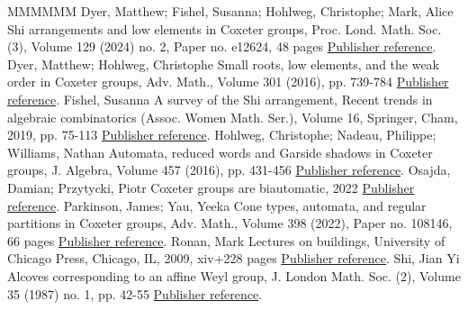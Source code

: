 \begin{thebibliography}{MMMMMM}
 Dyer, Matthew; Fishel, Susanna; Hohlweg, Christophe; Mark, Alice Shi arrangements and low elements in Coxeter groups, Proc. Lond. Math. Soc. (3), Volume 129 (2024) no. 2, Paper no. e12624, 48 pages \href{https://alco.centre-mersenne.org/articles/10.5802/alco.387/#DHFM}{Publisher reference}.
 Dyer, Matthew; Hohlweg, Christophe Small roots, low elements, and the weak order in Coxeter groups, Adv. Math., Volume 301 (2016), pp. 739-784 \href{https://alco.centre-mersenne.org/articles/10.5802/alco.387/#DH}{Publisher reference}.
 Fishel, Susanna A survey of the Shi arrangement, Recent trends in algebraic combinatorics (Assoc. Women Math. Ser.), Volume 16, Springer, Cham, 2019, pp. 75-113 \href{https://alco.centre-mersenne.org/articles/10.5802/alco.387/#MR3969572}{Publisher reference}.
 Hohlweg, Christophe; Nadeau, Philippe; Williams, Nathan Automata, reduced words and Garside shadows in Coxeter groups, J. Algebra, Volume 457 (2016), pp. 431-456 \href{https://alco.centre-mersenne.org/articles/10.5802/alco.387/#HNW}{Publisher reference}.
 Osajda, Damian; Przytycki, Piotr Coxeter groups are biautomatic, 2022 \href{https://alco.centre-mersenne.org/articles/10.5802/alco.387/#OP}{Publisher reference}.
 Parkinson, James; Yau, Yeeka Cone types, automata, and regular partitions in Coxeter groups, Adv. Math., Volume 398 (2022), Paper no. 108146, 66 pages \href{https://alco.centre-mersenne.org/articles/10.5802/alco.387/#Parkinson-Yau_2022}{Publisher reference}.
 Ronan, Mark Lectures on buildings, University of Chicago Press, Chicago, IL, 2009, xiv+228 pages \href{https://alco.centre-mersenne.org/articles/10.5802/alco.387/#Ronan_2009}{Publisher reference}.
 Shi, Jian Yi Alcoves corresponding to an affine Weyl group, J. London Math. Soc. (2), Volume 35 (1987) no. 1, pp. 42-55 \href{https://alco.centre-mersenne.org/articles/10.5802/alco.387/#Shi_1987}{Publisher reference}.
\end{thebibliography}
